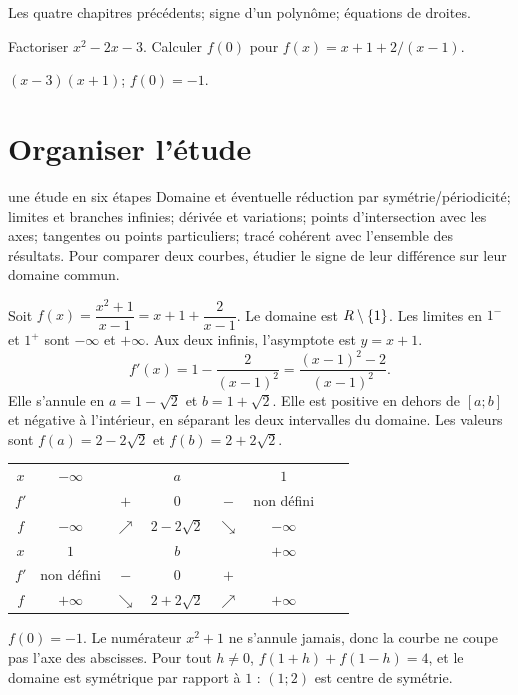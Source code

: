 \label{t11s-c05}
\begin{revision}Les quatre chapitres précédents; signe d’un polynôme; équations de droites.\end{revision}
\begin{automatismes}\exo\label{t11s-c05-auto}Factoriser $x^2-2x-3$. Calculer $f(0)$ pour $f(x)=x+1+2/(x-1)$.\end{automatismes}
\begin{corrige}\label{sol-t11s-c05-auto}$(x-3)(x+1)$; $f(0)=-1$.\end{corrige}

\section{Organiser l’étude}
\begin{methode}{une étude en six étapes}
Domaine et éventuelle réduction par symétrie/périodicité; limites et branches infinies; dérivée et variations; points d’intersection avec les axes; tangentes ou points particuliers; tracé cohérent avec l’ensemble des résultats. Pour comparer deux courbes, étudier le signe de leur différence sur leur domaine commun.
\end{methode}
\begin{exemple}
Soit $f(x)=\dfrac{x^2+1}{x-1}=x+1+\dfrac2{x-1}$.
Le domaine est $R\setminus\{1\}$. Les limites en $1^-$ et $1^+$ sont $-\infty$ et $+\infty$. Aux deux infinis, l’asymptote est $y=x+1$.
\[
f'(x)=1-\frac2{(x-1)^2}
=\frac{(x-1)^2-2}{(x-1)^2}.
\]
Elle s’annule en $a=1-\sqrt2$ et $b=1+\sqrt2$. Elle est positive en dehors de $[a;b]$ et négative à l’intérieur, en séparant les deux intervalles du domaine. Les valeurs sont $f(a)=2-2\sqrt2$ et $f(b)=2+2\sqrt2$.
\begin{center}\begin{tabular}{c|ccccccc}
$x$&$-\infty$&&$a$&&$1$&&\\
$f'$&&$+$&$0$&$-$&non défini&&\\
$f$&$-\infty$&$\nearrow$&$2-2\sqrt2$&$\searrow$&$-\infty$&&\\\hline
$x$&$1$&&$b$&&$+\infty$&&\\
$f'$&non défini&$-$&$0$&$+$&&&\\
$f$&$+\infty$&$\searrow$&$2+2\sqrt2$&$\nearrow$&$+\infty$&&
\end{tabular}\end{center}
$f(0)=-1$. Le numérateur $x^2+1$ ne s’annule jamais, donc la courbe ne coupe pas l’axe des abscisses. Pour tout $h\ne0$, $f(1+h)+f(1-h)=4$, et le domaine est symétrique par rapport à $1$ : $(1;2)$ est centre de symétrie.
\end{exemple}
